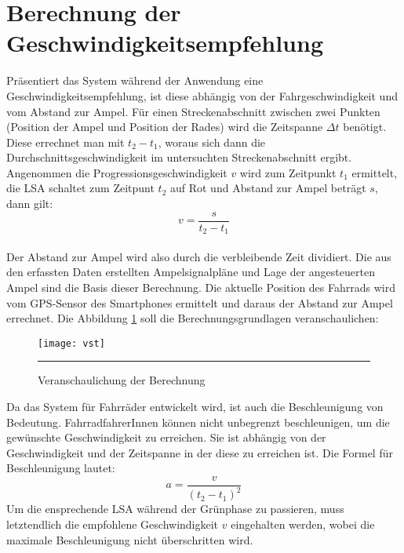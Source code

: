 \section{\label{sec:mathGrundlagen}Berechnung der Geschwindigkeitsempfehlung}
Präsentiert das System während der Anwendung eine Geschwindigkeitsempfehlung, ist diese abhängig von der Fahrgeschwindigkeit und vom Abstand zur Ampel. Für einen Streckenabschnitt zwischen zwei Punkten (Position der Ampel und Position der Rades) wird die Zeitspanne $\Delta t$ benötigt. Diese errechnet man mit $t_{2} - t_{1}$, woraus sich dann die Durchschnittsgeschwindigkeit im untersuchten Streckenabschnitt ergibt.\\ 
Angenommen die Progressionsgeschwindigkeit $v$ wird zum Zeitpunkt $t_{1}$ ermittelt, die \gls {LSA} schaltet zum Zeitpunt $t_{2}$ auf Rot und Abstand zur Ampel beträgt $s$, dann gilt: \\
\[ v = \frac{s}{t_{2} - t_{1}} \] \\
Der Abstand zur Ampel wird also durch die verbleibende Zeit dividiert. 
Die aus den erfassten Daten erstellten Ampelsignalpläne und Lage der angesteuerten Ampel sind die Basis dieser Berechnung. Die aktuelle Position des Fahrrads wird vom \gls{GPS}-Sensor des \glspl{Smartphone} ermittelt und daraus der Abstand zur Ampel errechnet. Die Abbildung \ref{fig:vst} soll die Berechnungsgrundlagen veranschaulichen: 
\begin{figure}[H]  
    \centering  
    \texttt{[image: vst]}  
    \rule{35em}{0.5pt}   
    \caption[Berechnung Progressionsgeschwindigkeit]{Veranschaulichung der Berechnung}
    \label{fig:vst}
\end{figure}
Da das System für Fahrräder entwickelt wird, ist auch die Beschleunigung von Bedeutung. FahrradfahrerInnen können nicht unbegrenzt beschleunigen, um die gewünschte Geschwindigkeit zu erreichen. Sie ist abhängig von der Geschwindigkeit und der Zeitspanne in der diese zu erreichen ist. Die Formel für Beschleunigung lautet:
\[ a = \frac{v}{(t_{2} - t_{1})^{2}} \]
 Um die ensprechende \gls{LSA} während der Grünphase zu passieren, muss letztendlich die empfohlene Geschwindigkeit $v$ eingehalten werden, wobei die maximale Beschleunigung nicht überschritten wird.
